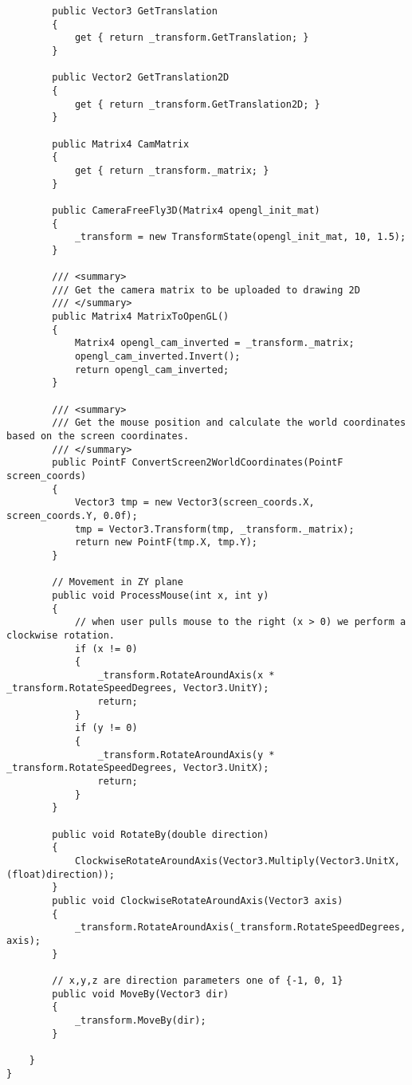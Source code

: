 \begin{scriptsize}
\begin{verbatim}
        public Vector3 GetTranslation
        {
            get { return _transform.GetTranslation; }
        }

        public Vector2 GetTranslation2D
        {
            get { return _transform.GetTranslation2D; }
        }

        public Matrix4 CamMatrix
        {
            get { return _transform._matrix; }
        }

        public CameraFreeFly3D(Matrix4 opengl_init_mat)
        {
            _transform = new TransformState(opengl_init_mat, 10, 1.5);
        }

        /// <summary>
        /// Get the camera matrix to be uploaded to drawing 2D
        /// </summary>
        public Matrix4 MatrixToOpenGL()
        {
            Matrix4 opengl_cam_inverted = _transform._matrix;
            opengl_cam_inverted.Invert();
            return opengl_cam_inverted;
        }

        /// <summary>
        /// Get the mouse position and calculate the world coordinates based on the screen coordinates.
        /// </summary>
        public PointF ConvertScreen2WorldCoordinates(PointF screen_coords)
        {
            Vector3 tmp = new Vector3(screen_coords.X, screen_coords.Y, 0.0f);
            tmp = Vector3.Transform(tmp, _transform._matrix);
            return new PointF(tmp.X, tmp.Y);
        }

        // Movement in ZY plane
        public void ProcessMouse(int x, int y)
        {
            // when user pulls mouse to the right (x > 0) we perform a clockwise rotation.
            if (x != 0)
            {
                _transform.RotateAroundAxis(x * _transform.RotateSpeedDegrees, Vector3.UnitY);
                return;
            }
            if (y != 0)
            {
                _transform.RotateAroundAxis(y * _transform.RotateSpeedDegrees, Vector3.UnitX);
                return;
            }
        }

        public void RotateBy(double direction)
        {
            ClockwiseRotateAroundAxis(Vector3.Multiply(Vector3.UnitX, (float)direction));
        }
        public void ClockwiseRotateAroundAxis(Vector3 axis)
        {
            _transform.RotateAroundAxis(_transform.RotateSpeedDegrees, axis);
        }

        // x,y,z are direction parameters one of {-1, 0, 1}
        public void MoveBy(Vector3 dir)
        {
            _transform.MoveBy(dir);
        }

    }
}


\end{verbatim}
\end{scriptsize}
